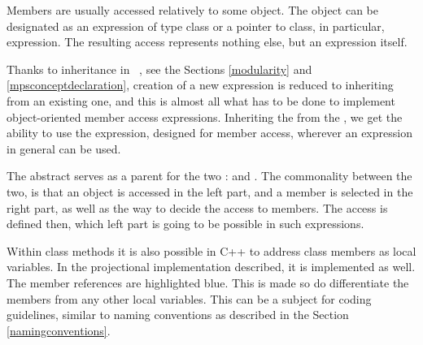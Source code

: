 
Members are usually accessed relatively to some object. The object can be designated as an expression of type class or a pointer to class,
in particular,  expression. The resulting access represents nothing else, but an expression itself.

Thanks to   inheritance in \jbmps\ , see the Sections \ref{modularity} and \ref{mpsconceptdeclaration},  creation of a new expression 
is reduced to inheriting from an existing one, and this is almost all what has to be done to implement object-oriented member access expressions. 
Inheriting the   from the  
, we get the ability to use the expression, designed for member access, wherever an expression in general can be used. 

The abstract   serves as a parent for the two :
 and .
The commonality between the two, is that an object is accessed in the left part, and a member is selected in the right part, 
as well as the way to decide the access to members. The access is defined then, which left part is going to be possible in such expressions.

Within  class methods it is also possible in C++ to address class members as local variables. In the projectional implementation
described, it is implemented as well. The member references are highlighted blue. This is made so do differentiate the members from 
any other local variables. This can be a subject for coding guidelines, similar to naming conventions as described in the 
Section \ref{namingconventions}.


